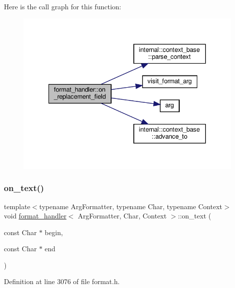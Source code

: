 Here is the call graph for this function\+:
\nopagebreak
\begin{figure}[H]
\begin{center}
\leavevmode
\includegraphics[width=327pt]{structformat__handler_abe898802a15ef6686480569ab638b38a_cgraph}
\end{center}
\end{figure}
\mbox{\label{structformat__handler_a0658a1b87089088fae4267f567e9ee7d}} 
\subsubsection{\texorpdfstring{on\+\_\+text()}{on\_text()}}
{\footnotesize\ttfamily template$<$typename Arg\+Formatter, typename Char, typename Context$>$ \\
void \hyperlink{structformat__handler}{format\+\_\+handler}$<$ Arg\+Formatter, Char, Context $>$\+::on\+\_\+text (\begin{DoxyParamCaption}\item[{const Char $\ast$}]{begin,  }\item[{const Char $\ast$}]{end }\end{DoxyParamCaption})\hspace{0.3cm}{\ttfamily [inline]}}



Definition at line 3076 of file format.\+h.

